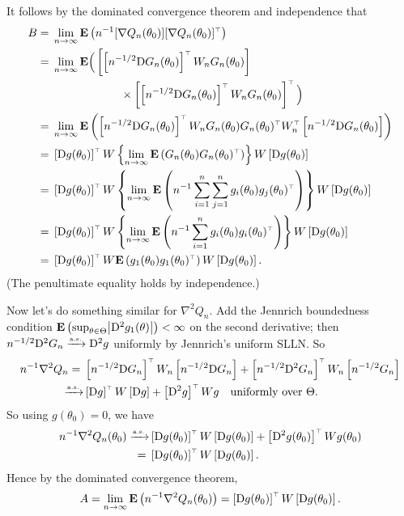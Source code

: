 \documentclass[11pt,letterpaper,reqno,oneside]{article}
\begin{document}
It follows by the dominated convergence theorem and independence that
%
\begin{align*}
	B
	={}& \lim_{n\to\infty}
	\mathbf{E}\left( n^{-1}
	[\nabla Q_n(\theta_0)] 
	[\nabla Q_n(\theta_0)]^{\scriptscriptstyle \top} 
	\right)
	\\
	={}& \lim_{n\to\infty}
	\mathbf{E}\Big( 
	\left[ \left[ n^{-1/2} \mathrm{D} G_n(\theta_0) \right]^{\scriptscriptstyle \top} W_n G_n(\theta_0) \right] 
	\\
	&\quad\quad\quad\quad\quad\quad\times
	\left[ \left[ n^{-1/2} \mathrm{D} G_n(\theta_0) \right]^{\scriptscriptstyle \top} W_n G_n(\theta_0) \right]^{\scriptscriptstyle \top} 
	\Big)
	\\
	={}& \lim_{n\to\infty}
	\mathbf{E}\left( 
	\left[ n^{-1/2} \mathrm{D} G_n(\theta_0) \right]^{\scriptscriptstyle \top} W_n G_n(\theta_0) 
	G_n(\theta_0)^{\scriptscriptstyle \top} W_n^{\scriptscriptstyle \top} \left[ n^{-1/2} \mathrm{D} G_n(\theta_0) \right]
	\right)
	\\
	={}& \left[ \mathrm{D} g(\theta_0) \right]^{\scriptscriptstyle \top} W 
	\left\{
	\lim_{n\to\infty}
	\mathbf{E}\left( 
	G_n(\theta_0) G_n(\theta_0)^{\scriptscriptstyle \top}
	\right)
	\right\}
	W \left[ \mathrm{D} g(\theta_0) \right]
	\\
	={}& \left[ \mathrm{D} g(\theta_0) \right]^{\scriptscriptstyle \top} W 
	\left\{
	\lim_{n\to\infty}
	\mathbf{E}\left( 
	n^{-1} \sum_{i=1}^n \sum_{j=1}^n g_i(\theta_0) g_j(\theta_0)^{\scriptscriptstyle \top}
	\right)
	\right\}
	W \left[ \mathrm{D} g(\theta_0) \right]
	\\
	={}& \left[ \mathrm{D} g(\theta_0) \right]^{\scriptscriptstyle \top} W 
	\left\{
	\lim_{n\to\infty}
	\mathbf{E}\left( 
	n^{-1} \sum_{i=1}^n g_i(\theta_0) g_i(\theta_0)^{\scriptscriptstyle \top}
	\right)
	\right\}
	W \left[ \mathrm{D} g(\theta_0) \right]
	\\
	={}& \left[ \mathrm{D} g(\theta_0) \right]^{\scriptscriptstyle \top} W 
	\mathbf{E}\left( g_1(\theta_0) g_1(\theta_0)^{\scriptscriptstyle \top} \right)
	W \left[ \mathrm{D} g(\theta_0) \right] .
\end{align*}
%
(The penultimate equality holds by independence.)

Now let's do something similar for $\nabla^2 Q_n$. Add the Jennrich boundedness condition $\E\left( \sup_{\theta \in \Theta} \abs*{\DD^2 g_1(\theta)} \right) < \infty$ on the second derivative; then $n^{-1/2} \mathrm{D}^2 G_n \xrightarrow{{\scriptscriptstyle \mathrm{a.s.}}} \mathrm{D}^2 g$ uniformly by Jennrich's uniform SLLN. So
%
\begin{align*}
	n^{-1} \nabla^2 Q_n 
	={}& \left[ n^{-1/2} \mathrm{D} G_n \right]^{\scriptscriptstyle \top} W_n \left[ n^{-1/2} \mathrm{D} G_n \right]
	+ \left[ n^{-1/2} \mathrm{D}^2 G_n \right]^{\scriptscriptstyle \top} W_n \left[ n^{-1/2} G_n \right]
	\\
	\xrightarrow{{\scriptscriptstyle \mathrm{a.s.}}}& \left[ \mathrm{D} g \right]^{\scriptscriptstyle \top} W \left[ \mathrm{D} g \right]
	+ \left[ \mathrm{D}^2 g \right]^{\scriptscriptstyle \top} W g
	\quad\text{uniformly over $\Theta$} .
\end{align*}
%
So using $g(\theta_0)=0$, we have
%
\begin{align*}
	n^{-1} \nabla^2 Q_n(\theta_0)
	\xrightarrow{{\scriptscriptstyle \mathrm{a.s.}}}& 
	\left[ \mathrm{D} g(\theta_0) \right]^{\scriptscriptstyle \top} W \left[ \mathrm{D} g(\theta_0) \right]
	+ \left[ \mathrm{D}^2 g(\theta_0) \right]^{\scriptscriptstyle \top} W g(\theta_0) 
	\\
	={}& 
	\left[ \mathrm{D} g(\theta_0) \right]^{\scriptscriptstyle \top} W \left[ \mathrm{D} g(\theta_0) \right] .
\end{align*}
%
Hence by the dominated convergence theorem,
%
\begin{equation*}
	A
	= \lim_{n\to\infty}
	\mathbf{E}\left( n^{-1} \nabla^2 Q_n(\theta_0) \right)
	= \left[ \mathrm{D} g(\theta_0) \right]^{\scriptscriptstyle \top} W \left[ \mathrm{D} g(\theta_0) \right] .
\end{equation*}
\end{document}
